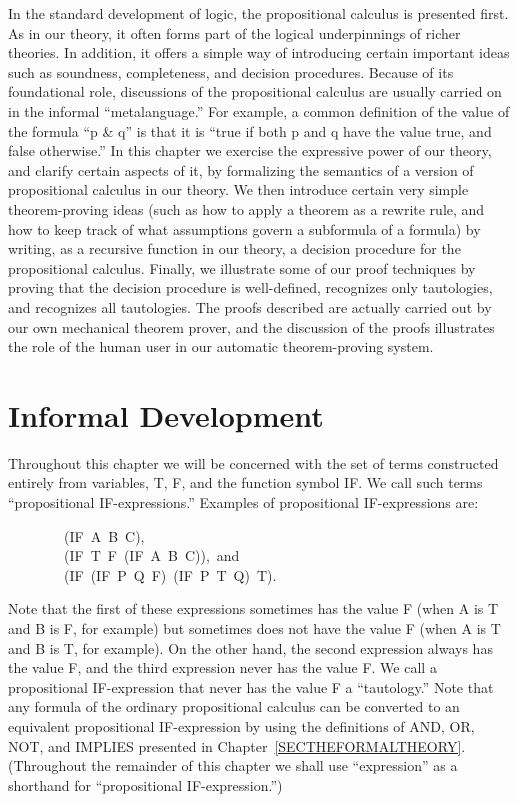 \documentclass[11pt]{book}
\newenvironment{pubasis}{\begin{flushleft}\ttfamily\small}{\normalsize\rmfamily\end{flushleft}}
\newcommand{\pubdefaulttextsize}{\large}
\begin{document}
In the standard development of logic, the propositional calculus
is presented first.  As in our theory, it often forms part of the
logical underpinnings of richer theories.  In addition, it offers
a simple way of introducing certain important ideas such as soundness,
completeness, and decision procedures.
Because of its foundational role, discussions of
the propositional calculus are usually carried on in the informal
``metalanguage.''  For example, a common definition of the value of
the formula ``p \& q'' is that it is ``true if both p and q have the value
true, and false otherwise.''  In this chapter we exercise
the expressive power of our theory, and clarify certain aspects of it,
by formalizing the semantics of a version of propositional calculus in our theory.
We then introduce certain very simple theorem-proving ideas (such as
how to apply a theorem as a rewrite rule, and how to
keep track of what assumptions govern a subformula of a formula) by
writing, as a recursive function in our theory, a decision procedure
for the propositional calculus.  Finally, we illustrate some of our proof
techniques by proving that the decision procedure is well-defined,
recognizes only tautologies, and recognizes all tautologies.
The proofs described are actually carried out by our own mechanical theorem
prover, and the discussion of the proofs illustrates the role of the human
user in our automatic theorem-proving system.
\section{Informal Development}
\pubdefaulttextsize
Throughout this chapter we will be concerned with
the set of terms constructed entirely from variables, T, F,
and the function symbol IF.  We call such terms ``propositional
IF-expressions.''  Examples of propositional IF-expressions are:
\begin{pubasis}
~~~~~~~~(IF~A~B~C),\\

~~~~~~~~(IF~T~F~(IF~A~B~C)),~and\\

~~~~~~~~(IF~(IF~P~Q~F)~(IF~P~T~Q)~T).\\
\end{pubasis}
Note that the first of these expressions sometimes has the value F
(when A is T and B is F, for example) but sometimes does not have the value F
(when A is T and B is T, for example).  On the other hand, the
second expression always has the value F, and the third expression
never has the value F.  We  call a propositional IF-expression that never
has the value F a ``tautology.''  Note that any  formula of the ordinary propositional calculus can
be converted to an equivalent propositional IF-expression 
by using the definitions of AND, OR, NOT, and IMPLIES
presented in Chapter~\ref{SECTHEFORMALTHEORY}.
(Throughout the remainder of this chapter
we shall use ``expression'' as a shorthand for ``propositional IF-expression.'')
\end{document}
